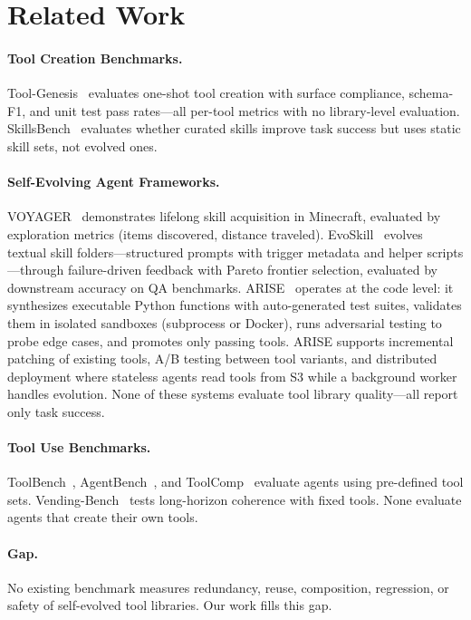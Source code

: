 \documentclass[]{ceurart}
\begin{document}
\section{Related Work}

\paragraph{Tool Creation Benchmarks.} Tool-Genesis~\cite{xia2026toolgenesis} evaluates one-shot tool creation with surface compliance, schema-F1, and unit test pass rates---all per-tool metrics with no library-level evaluation. SkillsBench~\cite{skillsbench2026} evaluates whether curated skills improve task success but uses static skill sets, not evolved ones.

\paragraph{Self-Evolving Agent Frameworks.} VOYAGER~\cite{wang2023voyager} demonstrates lifelong skill acquisition in Minecraft, evaluated by exploration metrics (items discovered, distance traveled). EvoSkill~\cite{alzubi2026evoskill} evolves textual skill folders---structured prompts with trigger metadata and helper scripts---through failure-driven feedback with Pareto frontier selection, evaluated by downstream accuracy on QA benchmarks. ARISE~\cite{kaliyev2026arise} operates at the code level: it synthesizes executable Python functions with auto-generated test suites, validates them in isolated sandboxes (subprocess or Docker), runs adversarial testing to probe edge cases, and promotes only passing tools. ARISE supports incremental patching of existing tools, A/B testing between tool variants, and distributed deployment where stateless agents read tools from S3 while a background worker handles evolution. None of these systems evaluate tool library quality---all report only task success.

\paragraph{Tool Use Benchmarks.} ToolBench~\cite{qin2023toolbench}, AgentBench~\cite{liu2024agentbench}, and ToolComp~\cite{toolcomp2025} evaluate agents using pre-defined tool sets. Vending-Bench~\cite{backlund2025vendingbench} tests long-horizon coherence with fixed tools. None evaluate agents that create their own tools.

\paragraph{Gap.} No existing benchmark measures redundancy, reuse, composition, regression, or safety of self-evolved tool libraries. Our work fills this gap.
\end{document}
